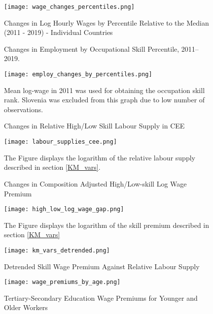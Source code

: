 \documentclass[11pt]{article}
\begin{document}
\begin{figure}[!htbp]%
    \centering
    \caption{Changes in Log Hourly Wages by Percentile Relative to the Median (2011 - 2019) - Individual Countries}
    {\texttt{[image: wage\_changes\_percentiles.png]} }
    \label{wage_changes_percentiles}
\end{figure}

\begin{figure}[!htbp]%
    \centering
    \caption{Changes in Employment by Occupational Skill Percentile, 2011–2019.}
    {\texttt{[image: employ\_changes\_by\_percentiles.png]}
    }
    \label{employ_changes_percentiles}
    \caption*{\footnotesize Mean log-wage in 2011 was used for obtaining the occupation skill rank. Slovenia was excluded from this graph due to low number of observations. }
\end{figure}

\begin{figure}[!htbp]%
        \centering
        \caption{Changes in Relative High/Low Skill Labour Supply in CEE}
        {\texttt{[image: labour\_supplies\_cee.png]}}
        \label{labour_supplies_cee}
        \caption*{\footnotesize The Figure displays the logarithm of the relative labour supply described in section \ref{KM_vars}.}
\end{figure}

\begin{figure}[!htbp]%
    \centering
    \caption{Changes in Composition Adjusted High/Low-skill Log Wage Premium}
    {\texttt{[image: high\_low\_log\_wage\_gap.png]}}
    \label{high_low_log_wage_gap}
    \caption*{\footnotesize The Figure displays the logarithm of the skill premium described in section \ref{KM_vars}}
\end{figure}


\begin{figure}[!htbp]%
    \centering
    \caption{Detrended Skill Wage Premium Against Relative Labour Supply}
    {\texttt{[image: km\_vars\_detrended.png]} }
    \label{km_vars_detrended}
\end{figure}


\begin{figure}[!htbp]%
    \centering
    \caption{Tertiary-Secondary Education Wage Premiums for Younger and Older Workers}
    {\texttt{[image: wage\_premiums\_by\_age.png]} }
    \label{wage_premiums_by_age}
\end{figure}
\end{document}
